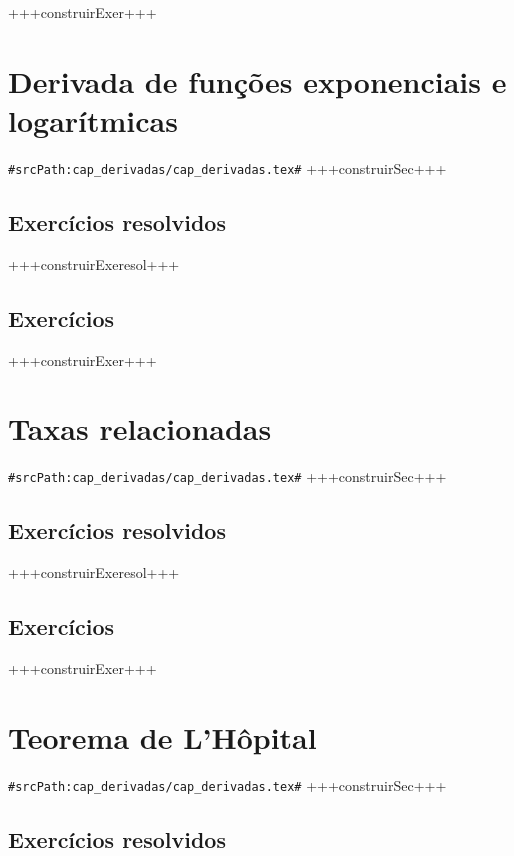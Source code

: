 +++construirExer+++


\section{Derivada de funções exponenciais e logarítmicas}
\verb+#srcPath:cap_derivadas/cap_derivadas.tex#+
+++construirSec+++

\subsection*{Exercícios resolvidos}

+++construirExeresol+++


\subsection*{Exercícios}

+++construirExer+++


\section{Taxas relacionadas}
\verb+#srcPath:cap_derivadas/cap_derivadas.tex#+
+++construirSec+++

\subsection*{Exercícios resolvidos}

+++construirExeresol+++


\subsection*{Exercícios}

+++construirExer+++


\section{Teorema de L'Hôpital}
\verb+#srcPath:cap_derivadas/cap_derivadas.tex#+
+++construirSec+++

\subsection*{Exercícios resolvidos}

